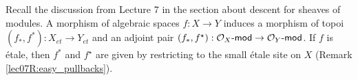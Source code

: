 
 Recall the discussion from Lecture 7 in the section about descent for sheaves of
 modules. A morphism of algebraic spaces $f:X\to Y$ induces a morphism of
 topoi $(f_*,f^*):X_{et}\to Y_{et}$ and an adjoint pair $(f_*,f^\star):\mathcal{O}_X\textrm{-\sf mod}\to
 \mathcal{O}_Y\textrm{-\sf mod}$. If $f$ is \'etale, then $f^*$ and $f^\star$ are given by restricting to the
 small \'etale site on $X$ (Remark \ref{lec07R:easy_pullbacks}).


